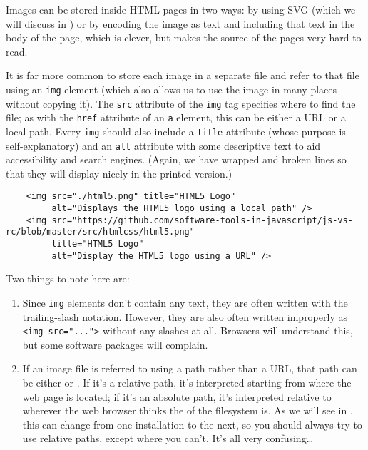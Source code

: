 Images can be stored inside HTML pages in two ways:
by using SVG (which we will discuss in )
or by encoding the image as text and including that text in the body of the page,
which is clever,
but makes the source of the pages very hard to read.

It is far more common to store each image in a separate file
and refer to that file using an \texttt{img} element
(which also allows us to use the image in many places without copying it).
The \texttt{src} attribute of the \texttt{img} tag specifies where to find the file;
as with the \texttt{href} attribute of an \texttt{a} element,
this can be either a URL or a local path.
Every \texttt{img} should also include a \texttt{title} attribute (whose purpose is self-explanatory)
and an \texttt{alt} attribute with some descriptive text to aid accessibility and search engines.
(Again, we have wrapped and broken lines so that they will display nicely in the printed version.)

\begin{verbatim}
    <img src="./html5.png" title="HTML5 Logo"
         alt="Displays the HTML5 logo using a local path" />
    <img src="https://github.com/software-tools-in-javascript/js-vs-rc/blob/master/src/htmlcss/html5.png"
         title="HTML5 Logo"
         alt="Display the HTML5 logo using a URL" />
\end{verbatim}

Two things to note here are:

\begin{enumerate}
\item
  Since \texttt{img} elements don't contain any text,
  they are often written with the trailing-slash notation.
  However,
  they are also often written improperly as \texttt{{\textless}img\ src="..."{\textgreater}} without any slashes at all.
  Browsers will understand this,
  but some software packages will complain.
\item
  If an image file is referred to using a path rather than a URL,
  that path can be either  or .
  If it's a relative path,
  it's interpreted starting from where the web page is located;
  if it's an absolute path,
  it's interpreted relative to wherever the web browser thinks the  of the filesystem is.
  As we will see in ,
  this can change from one installation to the next,
  so you should always try to use relative paths,
  except where you can't.
  It's all very confusing{\ldots}
\end{enumerate}

